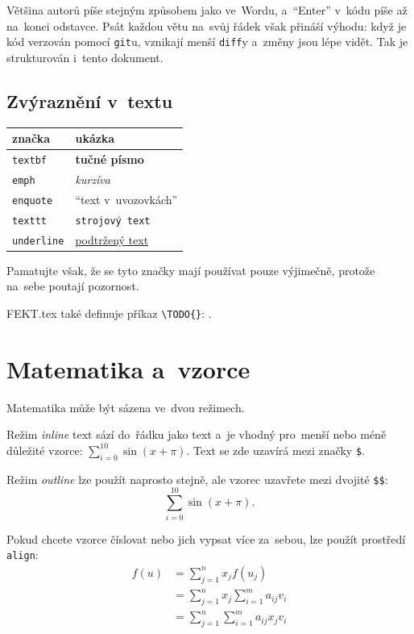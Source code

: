 Většina autorů píše stejným způsobem jako ve~Wordu, a~\enquote{Enter} v~kódu píše až na~konci odstavce.
Psát každou větu na~svůj řádek však přináší výhodu: když je kód verzován pomocí \texttt{git}u, vznikají menší \texttt{diff}y a~změny jsou lépe vidět.
Tak je strukturován i~tento dokument.
 
\subsection{Zvýraznění v~textu}

\begin{table}[ht]
\centering
\begin{tabular}{|l|l|}
značka & ukázka \\
\hline \hline
\texttt{textbf} & \textbf{tučné písmo} \\
\texttt{emph} & \emph{kurzíva} \\
\texttt{enquote} & \enquote{text v~uvozovkách} \\
\texttt{texttt} & \texttt{strojový text} \\
\texttt{underline} & \underline{podtržený text} \\
\end{tabular}
\end{table}
\FloatBarrier

Pamatujte však, že se tyto značky mají používat pouze výjimečně, protože na~sebe poutají pozornost.

FEKT.tex také definuje příkaz \verb|\TODO{}|: .

\clearpage
\section{Matematika a~vzorce}

Matematika může být sázena ve~dvou režimech.

Režim \emph{inline} text sází do~řádku jako text a~je vhodný pro~menší nebo méně důležité vzorce:
$\sum_{i=0}^{10} \sin (x + \pi)$.
Text se zde uzavírá mezi značky \verb|$|.

Režim \emph{outline} lze použít naprosto stejně, ale vzorec uzavřete mezi dvojité \verb|$$|:
$$\sum_{i=0}^{10} \sin (x + \pi).$$

Pokud chcete vzorce číslovat nebo jich vypsat více za~sebou, lze použít prostředí \texttt{align}:
\begin{align*}
f(u) & =\sum_{j=1}^{n} x_jf(u_j) \\
     & =\sum_{j=1}^{n} x_j \sum_{i=1}^{m} a_{ij}v_i \\
     & =\sum_{j=1}^{n} \sum_{i=1}^{m} a_{ij}x_jv_i
\end{align*}

